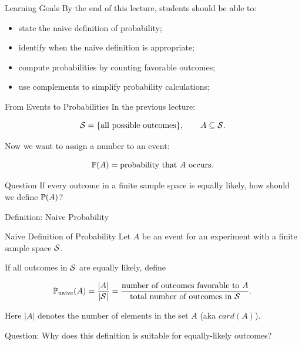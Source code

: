\setcounter{framenumber}{0}

\begin{frame}
  \titlepage
\end{frame}

\begin{frame}{Learning Goals}
By the end of this lecture, students should be able to:

\begin{itemize}
    \item state the naive definition of probability;
    \item identify when the naive definition is appropriate;
    \item compute probabilities by counting favorable outcomes;
    \item use complements to simplify probability calculations;
\end{itemize}
\end{frame}


\begin{frame}{From Events to Probabilities}
In the previous lecture:

\[
\mathcal{S} = \{\text{all possible outcomes}\},
\qquad
A \subseteq \mathcal{S}.
\]

\vspace{0.25cm}

Now we want to assign a number to an event:

\[
\mathbb{P}(A) = \text{probability that } A \text{ occurs}.
\]

\vspace{0.25cm}

\begin{keybox}{Question}
If every outcome in a finite sample space is equally likely, how should we define $\mathbb{P}(A)$?
\end{keybox}
\end{frame}

\begin{frame}{Definition: Naive Probability}
\begin{keybox}{Naive Definition of Probability}
Let $A$ be an event for an experiment with a finite sample space $\mathcal{S}$.

If all outcomes in $\mathcal{S}$ are equally likely, define

\[
\mathbb{P}_{\mathrm{naive}}(A)
=
\frac{|A|}{|\mathcal{S}|}
=
\frac{\text{number of outcomes favorable to } A}
{\text{total number of outcomes in } \mathcal{S}}.
\]
\end{keybox}

\vspace{0.25cm}

Here $|A|$ denotes the number of elements in the set $A$ (aka $card(A)$).
\vspace{1mm}

Question: Why does this definition is suitable for equally-likely outcomes?

\end{frame}

